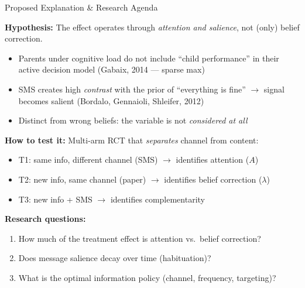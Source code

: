 \documentclass[11pt]{beamer}
\begin{document}
\begin{frame}{Proposed Explanation \& Research Agenda}

\textbf{Hypothesis:} The effect operates through \emph{attention and salience}, not (only) belief correction.
\begin{itemize}
    \item Parents under cognitive load do not include ``child performance'' in their active decision model (Gabaix, 2014 --- sparse max)
    \item SMS creates high \emph{contrast} with the prior of ``everything is fine'' $\to$ signal becomes salient (Bordalo, Gennaioli, Shleifer, 2012)
    \item Distinct from wrong beliefs: the variable is not \emph{considered at all}
\end{itemize}

\vspace{0.3cm}
\textbf{How to test it:} Multi-arm RCT that \emph{separates} channel from content:
\begin{itemize}
    \item T1: same info, different channel (SMS) $\to$ identifies attention ($A$)
    \item T2: new info, same channel (paper) $\to$ identifies belief correction ($\lambda$)
    \item T3: new info + SMS $\to$ identifies complementarity
\end{itemize}

\vspace{0.3cm}
\textbf{Research questions:}
\begin{enumerate}
    \item How much of the treatment effect is attention vs.\ belief correction?
    \item Does message salience decay over time (habituation)?
    \item What is the optimal information policy (channel, frequency, targeting)?
\end{enumerate}

\end{frame}
\end{document}
